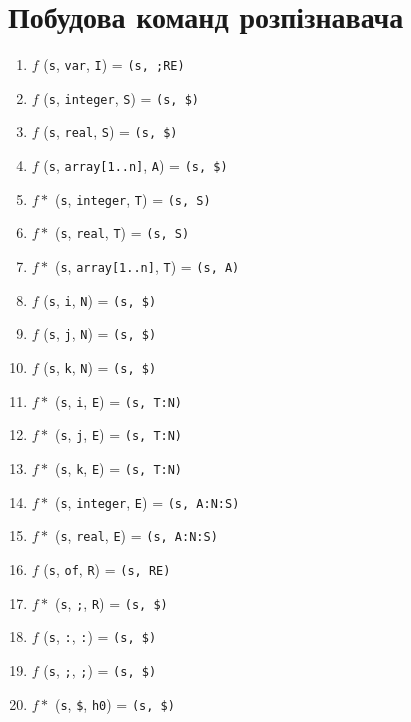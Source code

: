 \section{Побудова команд розпізнавача}
\begin{enumerate}
    \item  $f$  (\verb|s|,  \verb|var|,         \verb|I|)       = \verb|(s, ;RE)|\
    \item  $f$  (\verb|s|,  \verb|integer|,     \verb|S|)       = \verb|(s, $)|\
    \item  $f$  (\verb|s|,  \verb|real|,        \verb|S|)       = \verb|(s, $)|\
    \item  $f$  (\verb|s|,  \verb|array[1..n]|, \verb|A|)       = \verb|(s, $)|\
    \item  $f*$ (\verb|s|,  \verb|integer|,     \verb|T|)       = \verb|(s, S)|\
    \item  $f*$ (\verb|s|,  \verb|real|,        \verb|T|)       = \verb|(s, S)|\
    \item  $f*$ (\verb|s|,  \verb|array[1..n]|, \verb|T|)       = \verb|(s, A)|\
    \item  $f$  (\verb|s|,  \verb|i|,           \verb|N|)       = \verb|(s, $)|\
    \item  $f$  (\verb|s|,  \verb|j|,           \verb|N|)       = \verb|(s, $)|\
    \item  $f$  (\verb|s|,  \verb|k|,           \verb|N|)       = \verb|(s, $)|\
    \item  $f*$ (\verb|s|,  \verb|i|,           \verb|E|)       = \verb|(s, T:N)|\
    \item  $f*$ (\verb|s|,  \verb|j|,           \verb|E|)       = \verb|(s, T:N)|\
    \item  $f*$ (\verb|s|,  \verb|k|,           \verb|E|)       = \verb|(s, T:N)|\
    \item  $f*$ (\verb|s|,  \verb|integer|,     \verb|E|)       = \verb|(s, A:N:S)|\
    \item  $f*$ (\verb|s|,  \verb|real|,        \verb|E|)       = \verb|(s, A:N:S)|\
    \item  $f$  (\verb|s|,  \verb|of|,          \verb|R|)       = \verb|(s, RE)|\
    \item  $f*$ (\verb|s|,  \verb|;|,           \verb|R|)       = \verb|(s, $)|\

    \item  $f$  (\verb|s|,  \verb|:|,           \verb|:|)       = \verb|(s, $)|\
    \item  $f$  (\verb|s|,  \verb|;|,           \verb|;|)       = \verb|(s, $)|\
    \item  $f*$ (\verb|s|,  \verb|$|,           \verb|h0|)      = \verb|(s, $)|\
\end{enumerate}

